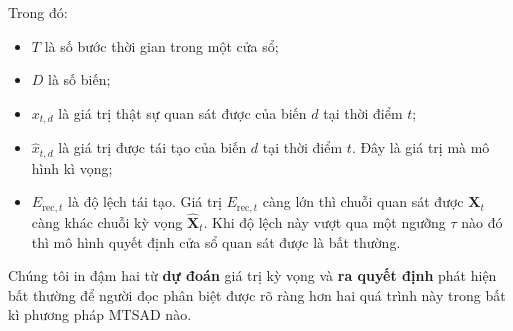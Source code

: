 \pagebreak
Trong đó:
\begin{itemize}
    \item \(T\) là số bước thời gian trong một cửa sổ;
    
    \item \(D\) là số biến;
    
    \item \(x_{t,d}\) là giá trị thật sự quan sát được của biến \(d\) tại thời điểm \(t\);
    
    \item \(\widehat{x}_{t,d}\) là giá trị được tái tạo của biến \(d\) tại thời điểm \(t\). Đây là giá trị mà mô hình kì vọng;
    
    \item \(E_{\mathrm{rec},t}\) là độ lệch tái tạo. Giá trị
    \(E_{\mathrm{rec},t}\) càng lớn thì chuỗi quan sát được \(\mathbf{X}_t\)
    càng khác chuỗi kỳ vọng \(\widehat{\mathbf{X}}_t\). Khi độ lệch này vượt qua một ngưỡng \(\tau\) nào đó thì mô hình quyết định cửa sổ quan sát được là bất thường.
\end{itemize}

Chúng tôi in đậm hai từ \textbf{dự đoán} giá trị kỳ vọng và \textbf{ra quyết định} phát hiện bất thường để người đọc phân biệt được rõ ràng hơn hai quá trình này trong bất kì phương pháp MTSAD nào.


